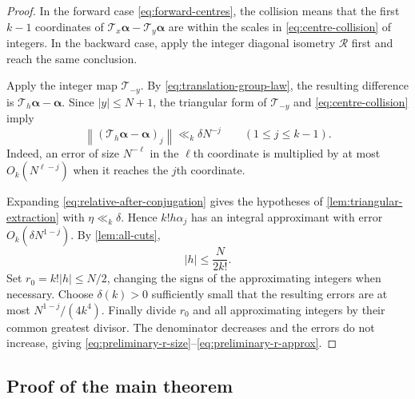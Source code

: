 \documentclass[11pt,reqno]{amsart}
\numberwithin{equation}{section}
\theoremstyle{definition}
\theoremstyle{remark}
\newcommand{\cR}{\mathcal R}
\newcommand{\cT}{\mathcal T}
\begin{document}
\begin{proof}
In the forward case \eqref{eq:forward-centres}, the collision means that the first $k-1$ coordinates of
$\cT_x\boldsymbol\alpha-\cT_y\boldsymbol\alpha$ are within the scales in \eqref{eq:centre-collision} of integers.  In the backward case, apply the integer diagonal isometry $\cR$ first and reach the same conclusion.

Apply the integer map $\cT_{-y}$.  By \eqref{eq:translation-group-law}, the resulting difference is
$\cT_h\boldsymbol\alpha-\boldsymbol\alpha$.  Since $|y|\le N+1$, the triangular form of $\cT_{-y}$ and \eqref{eq:centre-collision} imply
\begin{equation}\label{eq:relative-after-conjugation}
  \left\|(\cT_h\boldsymbol\alpha-\boldsymbol\alpha)_j\right\|
  \ll_k\delta N^{-j}
  \qquad(1\le j\le k-1).
\end{equation}
Indeed, an error of size $N^{-\ell}$ in the $\ell$th coordinate is multiplied by at most $O_k(N^{\ell-j})$ when it reaches the $j$th coordinate.

Expanding \eqref{eq:relative-after-conjugation} gives the hypotheses of \cref{lem:triangular-extraction} with $\eta\ll_k\delta$.  Hence $k!h\alpha_j$ has an integral approximant with error $O_k(\delta N^{1-j})$.  By \cref{lem:all-cuts},
\[
  |h|\le \frac{N}{2k!}.
\]
Set $r_0=k!|h|\le N/2$, changing the signs of the approximating integers when necessary.  Choose $\delta(k)>0$ sufficiently small that the resulting errors are at most $N^{1-j}/(4k^4)$.  Finally divide $r_0$ and all approximating integers by their common greatest divisor.  The denominator decreases and the errors do not increase, giving \eqref{eq:preliminary-r-size}--\eqref{eq:preliminary-r-approx}.
\end{proof}

\subsection{Proof of the main theorem}
\end{document}
